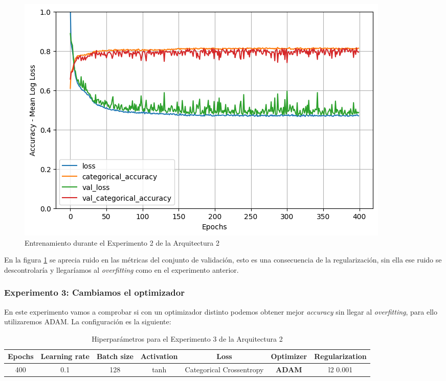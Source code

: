 \documentclass{article}
\begin{document}
			\begin{figure}[!h]
				\begin{center}
					\includegraphics[scale=0.5]{d-tr-a2-e2.png}		
					\caption{Entrenamiento durante el Experimento 2 de la Arquitectura 2}	
					\label{d-tr-a2-e2}
				\end{center}
			\end{figure}
			
			En la figura \ref{d-tr-a2-e2} se aprecia ruido en las m\'etricas del conjunto de validaci\'on, esto es una consecuencia de la regularizaci\'on, sin ella ese ruido se descontrolar\'ia y llegar\'iamos al \textit{overfitting} como en el experimento anterior.
			
			
		\subsubsection{Experimento 3: Cambiamos el optimizador}
		\label{d-s-a2-e3}
			En este experimento vamos a comprobar si con un optimizador distinto podemos obtener mejor \textit{accuracy} sin llegar al \textit{overfitting}, para ello utilizaremos ADAM. La configuraci\'on es la siguiente:
			
			\begin{table}[!h]
				\begin{center}
					\begin{tabular}{| c | c | c | c | c | c | c |}
						\textbf{Epochs} & \textbf{Learning rate} & \textbf{Batch size} & \textbf{Activation} & \textbf{Loss} & \textbf{Optimizer} & \textbf{Regularization} \\ \hline
						400 & 0.1 & 128 & tanh & Categorical Crossentropy & \textbf{ADAM} & l2 0.001
					\end{tabular}
					\caption{Hiperpar\'ametros para el Experimento 3 de la Arquitectura 2}
					\label{tab:hip-d-a2-e3}
				\end{center}
			\end{table}
			
\end{document}
